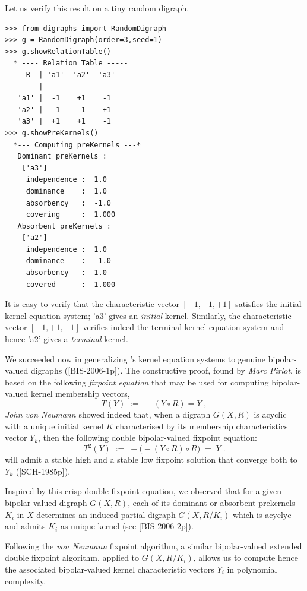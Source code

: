 Let us verify this result on a tiny random digraph.
\begin{lstlisting}
>>> from digraphs import RandomDigraph
>>> g = RandomDigraph(order=3,seed=1)
>>> g.showRelationTable()
  * ---- Relation Table -----
     R  | 'a1'  'a2'  'a3'	  
  ------|---------------------
   'a1' |  -1    +1    -1	 
   'a2' |  -1    -1    +1	 
   'a3' |  +1    +1    -1	 
>>> g.showPreKernels()
  *--- Computing preKernels ---*
   Dominant preKernels :
    ['a3']
     independence :  1.0
     dominance    :  1.0
     absorbency   :  -1.0
     covering     :  1.000
   Absorbent preKernels :
    ['a2']
     independence :  1.0
     dominance    :  -1.0
     absorbency   :  1.0
     covered      :  1.000
\end{lstlisting}
It is easy to verify that the characteristic vector $[-1, -1, +1]$ satisfies the initial kernel equation system; 'a3' gives an \emph{initial} kernel. Similarly, the characteristic vector $[-1, +1, -1]$ verifies indeed the terminal kernel equation system and hence 'a2' gives a \emph{terminal} kernel.

We succeeded now in generalizing \Berge's kernel equation systems to genuine bipolar-valued digraphs ([BIS-2006-1p]). The constructive proof, found by \emph{Marc Pirlot}, is based on the following \emph{fixpoint equation} that may be used for computing bipolar-valued kernel membership vectors,
\begin{equation}\label{eq:17.4}
T(Y) \; := \; -(Y \circ R) = Y\;,
\end{equation}
\emph{John von Neumann} showed indeed that, when a digraph $G(X,R)$ is acyclic with a unique initial kernel $K$ characterised by its membership characteristics vector $Y_k$, then the following double bipolar-valued fixpoint equation:
\begin{equation}\label{eq:17.5}
T^2(Y) \; := \; -\big( -(Y \circ R) \circ R) \; = \; Y\;.
\end{equation}
will admit a stable high and a stable low fixpoint solution that converge both to $Y_k$ ([SCH-1985p]).

Inspired by this crisp double fixpoint equation, we observed that for a given bipolar-valued digraph $G(X,R)$, each of its dominant or absorbent prekernels $K_i$ in $X$ determines an induced partial digraph $G(X,R/K_i)$ which is acyclyc and admits $K_i$ as unique kernel (see [BIS-2006-2p]).

Following the \emph{von Neumann} fixpoint algorithm, a similar bipolar-valued extended double fixpoint algorithm, applied to $G(X,R/K_i)$, allows us to compute hence the associated bipolar-valued kernel characteristic vectors $Y_i$ in polynomial complexity.

